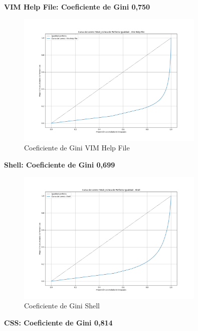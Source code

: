 \documentclass[a4paper, 12pt]{book}
\begin{document}
\begin{itemize}
\begin{itemize}
          \textbf{VIM Help File: Coeficiente de Gini 0,750}

          \begin{figure}[H]
            \centering
            \includegraphics[width=0.8\textwidth]{img/curva_lorenz_total_Vim Help File.png}
            \caption{Coeficiente de Gini VIM Help File}
            \label{figura:ginigraficaVIM}
          \end{figure}

          \textbf{Shell: Coeficiente de Gini 0,699}

          \begin{figure}[H]
            \centering
            \includegraphics[width=0.8\textwidth]{img/curva_lorenz_total_Shell.png}
            \caption{Coeficiente de Gini Shell}
            \label{figura:ginigraficaShell}
          \end{figure}

          \textbf{CSS: Coeficiente de Gini 0,814}


\end{itemize}
\end{itemize}
\end{document}
